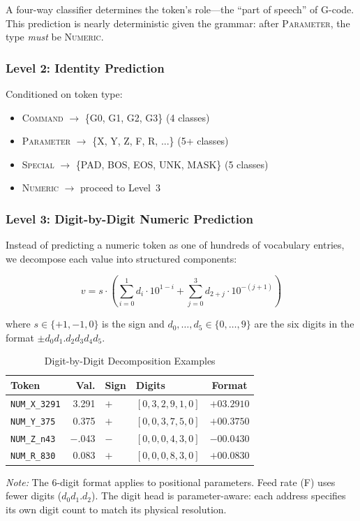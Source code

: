 \documentclass[11pt]{article}
\begin{document}
A four-way classifier determines the token's role---the ``part of speech'' of G-code. This prediction is nearly deterministic given the grammar: after \textsc{Parameter}, the type \emph{must} be \textsc{Numeric}.

\subsubsection{Level 2: Identity Prediction}

Conditioned on token type:
\begin{itemize}[leftmargin=*]
    \item \textsc{Command} $\to$ \{G0, G1, G2, G3\} (4 classes)
    \item \textsc{Parameter} $\to$ \{X, Y, Z, F, R, ...\} (5+ classes)
    \item \textsc{Special} $\to$ \{PAD, BOS, EOS, UNK, MASK\} (5 classes)
    \item \textsc{Numeric} $\to$ proceed to Level~3
\end{itemize}

\subsubsection{Level 3: Digit-by-Digit Numeric Prediction}

Instead of predicting a numeric token as one of hundreds of vocabulary entries, we decompose each value into structured components:

\begin{equation}
    v = s \cdot \left( \sum_{i=0}^{1} d_i \cdot 10^{1-i} + \sum_{j=0}^{3} d_{2+j} \cdot 10^{-(j+1)} \right)
\end{equation}

where $s \in \{+1, -1, 0\}$ is the sign and $d_0, \ldots, d_5 \in \{0, \ldots, 9\}$ are the six digits in the format $\pm d_0 d_1 . d_2 d_3 d_4 d_5$.

\begin{table}[htbp]
\centering
\caption{Digit-by-Digit Decomposition Examples}
\label{tab:digit_examples}
\small
\begin{tabular}{@{}lrllc@{}}
\toprule
\textbf{Token} & \textbf{Val.} & \textbf{Sign} & \textbf{Digits} & \textbf{Format} \\
\midrule
\texttt{NUM\_X\_3291}  & 3.291  & $+$ & $[0,3,2,9,1,0]$ & $+03.2910$ \\
\texttt{NUM\_Y\_375}   & 0.375  & $+$ & $[0,0,3,7,5,0]$ & $+00.3750$ \\
\texttt{NUM\_Z\_n43}   & $-$.043 & $-$ & $[0,0,0,4,3,0]$ & $-00.0430$ \\
\texttt{NUM\_R\_830}   & 0.083  & $+$ & $[0,0,0,8,3,0]$ & $+00.0830$ \\
\bottomrule
\end{tabular}
\normalsize

{\small\textit{Note:} The 6-digit format applies to positional parameters. Feed rate (F) uses fewer digits ($d_0 d_1.d_2$). The digit head is parameter-aware: each address specifies its own digit count to match its physical resolution.}
\end{table}
\end{document}
